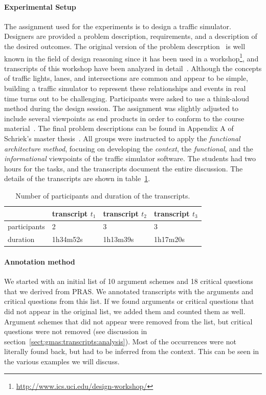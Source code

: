 \paragraph{Experimental Setup} The assignment used for the experiments is to design a traffic simulator. Designers are provided a problem description, requirements, and a description of the desired outcomes. The original version of the problem descrption~\cite{UCIworkshop} is well known in the field of design reasoning since it has been used in a workshop\footnote{\url{http://www.ics.uci.edu/design-workshop/}}, and transcripts of this workshop have been analyzed in detail~\cite{Petre:2013:SDA:2535028}. Although the concepts of traffic lights, lanes, and intersections are common and appear to be simple, building a traffic simulator to represent these relationships and events in real time turns out to be challenging. Participants were asked to use a think-aloud method during the design session. The assignment was slightly adjusted to include several viewpoints as end products in order to conform to the course material~\cite{Bass:2012:SAP:2392670}. The final problem descriptions can be found in Appendix A of Schriek's master thesis~\cite{masterthesis1}. All groups were instructed to apply the \emph{functional architecture method}, focusing on developing the \emph{context}, the \emph{functional}, and the \emph{informational} viewpoints of the traffic simulator software. The students had two hours for the tasks, and the transcripts document the entire discussion. The details of the transcripts are shown in table~\ref{table:transcripts:info}.

\begin{table}[ht]
\centering
\begin{tabular}{|l|l|l|l|}
\hline
& transcript $t_1$ & transcript $t_2$ & transcript $t_3$\\
\hline
participants & 2 & 3 & 3\\
\hline
duration & 1h34m52s & 1h13m39s & 1h17m20s\\
\hline
\end{tabular}
\caption{Number of participants and duration of the transcripts.}
\label{table:transcripts:info}
\end{table}

\paragraph{Annotation method} 

We started with an initial list of 10 argument schemes and 18 critical questions that we derived from PRAS. We annotated transcripts with the arguments and critical questions from this list. If we found arguments or critical questions that did not appear in the original list, we added them and counted them as well. Argument schemes that did not appear were removed from the list, but critical questions were not removed (see discussion in section~\ref{sect:gmas:transcripts:analysis}). Most of the occurrences were not literally found back, but had to be inferred from the context. This can be seen in the various examples we will discuss.

